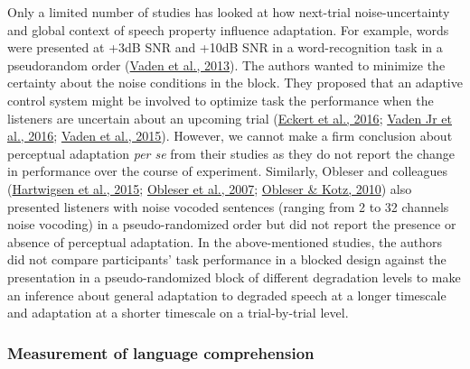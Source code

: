 \documentclass[a4paper, nobind]{templates/ociamthesis}
\begin{document}
Only a limited number of studies has looked at how next-trial noise-uncertainty and global context of speech property influence adaptation.
For example, words were presented at +3dB SNR and +10dB SNR in a word-recognition task in a pseudorandom order (\protect\hyperlink{ref-Vaden2013}{Vaden et al., 2013}).
The authors wanted to minimize the certainty about the noise conditions in the block.
They proposed that an adaptive control system might be involved to optimize task the performance when the listeners are uncertain about an upcoming trial (\protect\hyperlink{ref-Eckert2016}{Eckert et al., 2016}; \protect\hyperlink{ref-Vaden2016}{Vaden Jr et al., 2016}; \protect\hyperlink{ref-Vaden2015}{Vaden et al., 2015}).
However, we cannot make a firm conclusion about perceptual adaptation \emph{per se} from their studies as they do not report the change in performance over the course of experiment.
Similarly, Obleser and colleagues (\protect\hyperlink{ref-Hartwigsen2015}{Hartwigsen et al., 2015}; \protect\hyperlink{ref-Obleser2007}{Obleser et al., 2007}; \protect\hyperlink{ref-Obleser2010}{Obleser \& Kotz, 2010}) also presented listeners with noise vocoded sentences (ranging from 2 to 32 channels noise vocoding) in a pseudo-randomized order but did not report the presence or absence of perceptual adaptation.
In the above-mentioned studies, the authors did not compare participants' task performance in a blocked design against the presentation in a pseudo-randomized block of different degradation levels to make an inference about general adaptation to degraded speech at a longer timescale and adaptation at a shorter timescale on a trial-by-trial level.

\hypertarget{chapter-6-measurement}{%
\subsubsection{Measurement of language comprehension}\label{chapter-6-measurement}}
\end{document}
